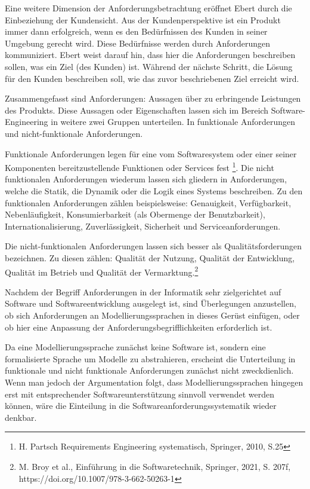 Eine weitere Dimension der Anforderungsbetrachtung eröffnet Ebert durch die Einbeziehung der Kundensicht. Aus der Kundenperspektive ist ein Produkt immer dann erfolgreich, wenn es den Bedürfnissen des Kunden in seiner Umgebung gerecht wird. Diese Bedürfnisse werden durch Anforderungen kommuniziert. Ebert weist darauf hin, dass hier die Anforderungen beschreiben sollen, was ein Ziel (des Kunden) ist. Während der nächste Schritt, die Lösung für den Kunden beschreiben soll, wie das zuvor beschriebenen Ziel erreicht wird.

Zusammengefasst sind Anforderungen: Aussagen über zu erbringende Leistungen des Produkts. Diese Aussagen oder Eigenschaften lassen sich im Bereich Software-Engineering in weitere zwei Gruppen unterteilen. 
In funktionale Anforderungen und nicht-funktionale Anforderungen.

Funktionale Anforderungen legen für eine vom Softwaresystem oder einer seiner Komponenten bereitzustellende Funktionen oder Services fest \footnote{H. Partsch Requirements Engineering systematisch, Springer, 2010, S.25}. Die nicht funktionalen Anforderungen wiederum lassen sich gliedern in Anforderungen, welche die Statik, die Dynamik oder die Logik eines Systems beschreiben. Zu den funktionalen Anforderungen zählen beispielsweise: Genauigkeit, Verfügbarkeit, Nebenläufigkeit, Konsumierbarkeit (als Obermenge der Benutzbarkeit), Internationalisierung, Zuverlässigkeit, Sicherheit und Serviceanforderungen.

Die nicht-funktionalen Anforderungen lassen sich besser als Qualitätsforderungen bezeichnen. Zu diesen zählen: Qualität der Nutzung, Qualität der Entwicklung, Qualität im Betrieb und Qualität der Vermarktung.\footnote{M. Broy et al., Einführung in die Softwaretechnik, Springer, 2021, S. 207f, https://doi.org/10.1007/978-3-662-50263-1} 


Nachdem der Begriff Anforderungen in der Informatik sehr zielgerichtet auf Software und Softwareentwicklung ausgelegt ist, sind Überlegungen anzustellen, ob sich Anforderungen an Modellierungssprachen in dieses Gerüst einfügen, oder ob hier eine Anpassung der Anforderungsbegrifflichkeiten erforderlich ist. 

Da eine Modellierungssprache zunächst keine Software ist, sondern eine formalisierte Sprache um Modelle zu abstrahieren, erscheint die Unterteilung in funktionale und nicht funktionale Anforderungen zunächst nicht zweckdienlich. Wenn man jedoch der Argumentation folgt, dass Modellierungssprachen hingegen erst mit entsprechender Softwareunterstützung sinnvoll verwendet werden können, wäre die Einteilung in die Softwareanforderungssystematik wieder denkbar. 

